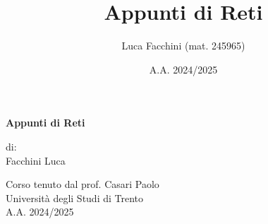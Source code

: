 \documentclass[twoside]{report}
\title{Appunti di Reti}
\author{Luca Facchini (mat. 245965)}
\date{A.A. 2024/2025}
\begin{document}
    \begin{titlepage}
        \centering  %
        {\Huge\textbf{Appunti di Reti}} \\[1cm] %
        \vspace{1.5cm}
        
        {\normalsize di: } \\[.3cm]
        {\Large Facchini Luca} \\ %
        \vspace{1.5cm}
        

        {\normalsize Corso tenuto dal prof. Casari Paolo} \\[0.3cm] %
        {\large Università degli Studi di Trento} \\[1.5cm]
        
        {\large A.A. 2024/2025} \\[3cm] %
        

\end{titlepage}
\end{document}
